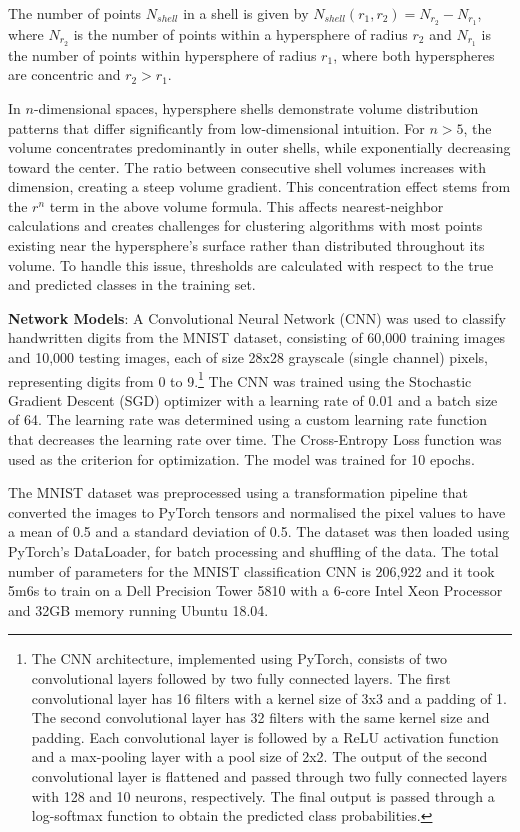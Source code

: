 The number of points $N_{shell}$ in a shell is given by $ N_{shell}(r_1,r_2) = N_{r_2} - N_{r_1} $, where $N_{r_2}$ is the number of points within a hypersphere of radius $r_2$ and $N_{r_1}$ is the number of points within hypersphere of radius $r_1$, where both hyperspheres are concentric and $r_2 > r_1$.

In $n$-dimensional spaces, hypersphere shells demonstrate volume distribution patterns that differ significantly from low-dimensional intuition. For $n > 5$, the volume concentrates predominantly in outer shells, while exponentially decreasing toward the center. The ratio between consecutive shell volumes increases with dimension, creating a steep volume gradient. This concentration effect stems from the $r^n$ term in the above volume formula. This affects nearest-neighbor calculations and creates challenges for clustering algorithms with most points existing near the hypersphere's surface rather than distributed throughout its volume. To handle this issue, thresholds are calculated with respect to the true and predicted classes in the training set.

\textbf{Network Models}: A Convolutional Neural Network (CNN) was used to classify handwritten digits from the MNIST dataset, consisting of 60,000 training images and 10,000 testing images, each of size 28x28 grayscale (single channel) pixels, representing digits from 0 to 9.\footnote{The CNN architecture, implemented using PyTorch, consists of two convolutional layers followed by two fully connected layers. The first convolutional layer has 16 filters with a kernel size of 3x3 and a padding of 1. The second convolutional layer has 32 filters with the same kernel size and padding. Each convolutional layer is followed by a ReLU activation function and a max-pooling layer with a pool size of 2x2. The output of the second convolutional layer is flattened and passed through two fully connected layers with 128 and 10 neurons, respectively. The final output is passed through a log-softmax function to obtain the predicted class probabilities.} The CNN was trained using the Stochastic Gradient Descent (SGD) optimizer with a learning rate of 0.01 and a batch size of 64. The learning rate was determined using a custom learning rate function that decreases the learning rate over time. The Cross-Entropy Loss function was used as the criterion for optimization. The model was trained for 10 epochs.

The MNIST dataset was preprocessed using a transformation pipeline that converted the images to PyTorch tensors and normalised the pixel values to have a mean of 0.5 and a standard deviation of 0.5. The dataset was then loaded using PyTorch's DataLoader, for batch processing and shuffling of the data. The total number of parameters for the MNIST classification CNN is 206,922 and it took 5m6s to train on a Dell Precision Tower 5810 with a 6-core Intel Xeon Processor and 32GB memory running Ubuntu 18.04.  

